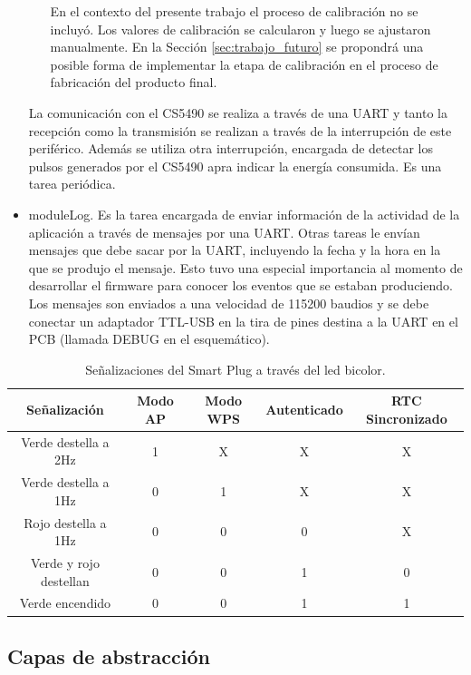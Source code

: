 \begin{itemize}
\begin{itemize}
En el contexto del presente trabajo el proceso de calibración no se incluyó. Los valores de calibración se calcularon y luego se ajustaron manualmente. En la Sección \ref{sec:trabajo_futuro} se propondrá una posible forma de implementar la etapa de calibración en el proceso de fabricación del producto final.
\end{itemize}

La comunicación con el CS5490 se realiza a través de una UART y tanto la recepción como la transmisión se realizan a través de la interrupción de este periférico. Además se utiliza otra interrupción, encargada de detectar los pulsos generados por el CS5490 apra indicar la energía consumida.
Es una tarea periódica.

\item moduleLog. Es la tarea encargada de enviar información de la actividad de la aplicación a través de mensajes por una UART. Otras tareas le envían mensajes que debe sacar por la UART, incluyendo la fecha y la hora en la que se produjo el mensaje. Esto tuvo una especial importancia al momento de desarrollar el firmware para conocer los eventos que se estaban produciendo. Los mensajes son enviados a una velocidad de 115200 baudios y se debe conectar un adaptador TTL-USB en la tira de pines destina a la UART en el PCB (llamada DEBUG en el esquemático).

\end{itemize}


\begin{table}[h]
	\centering
	\caption[Señalizaciones]{Señalizaciones del Smart Plug a través del led bicolor.}
	\begin{tabular}{c c c c c}    
		\toprule
		\textbf{Señalización} 	 & \textbf{Modo AP}  & \textbf{Modo WPS}  & \textbf{Autenticado}  & \textbf{RTC Sincronizado} \\
		\midrule
		Verde destella a 2Hz	 	& 1  & X  & X  & X \\		
		Verde destella a 1Hz	 	& 0  & 1  & X  & X \\
		Rojo destella a 1Hz	 		& 0  & 0  & 0  & X \\
		Verde y rojo destellan	 	& 0  & 0  & 1  & 0 \\
		Verde encendido	 			& 0  & 0  & 1  & 1 \\
		\bottomrule
		\hline
	\end{tabular}
	\label{tab:senializacion_leds}
\end{table}


\subsection{Capas de abstracción}

